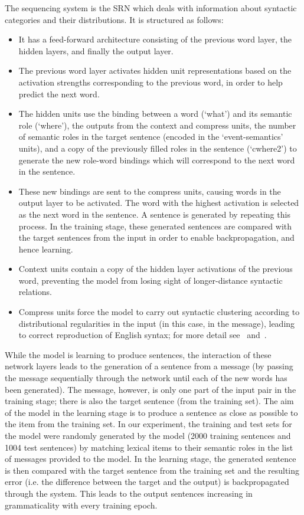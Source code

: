 \documentclass{article}
\begin{document}
The sequencing system is the SRN which deals with information about syntactic categories and their distributions. It is structured as follows:
\begin{itemize}
	\item It has a feed-forward architecture consisting of the previous word layer, the hidden layers, and finally the output layer.
	\item The previous word layer activates hidden unit representations based on the activation strengths corresponding to the previous word, in order to help predict the next word.
	\item The hidden units use the binding between a word (`what') and its semantic role (`where'), the outputs from the context and compress units, the number of semantic roles in the target sentence (encoded in the `event-semantics' units), and a copy of the previously filled roles in the sentence (`cwhere2') to generate the new role-word bindings which will correspond to the next word in the sentence.
	\item These new bindings are sent to the compress units, causing words in the output layer to be activated. The word with the highest activation is selected as the next word in the sentence. A sentence is generated by repeating this process. In the training stage, these generated sentences are compared with the target sentences from the input in order to enable backpropagation, and hence learning.
	\item Context units contain a copy of the hidden layer activations of the previous word, preventing the model from losing sight of longer-distance syntactic relations.
    \item Compress units force the model to carry out syntactic clustering according to distributional regularities in the input (in this case, in the message), leading to correct reproduction of English syntax; for more detail see~\cite{twomey2014} and~\cite{elman1993}.
\end{itemize}

While the model is learning to produce sentences, the interaction of these network layers leads to the generation of a sentence from a message (by passing the message sequentially through the network until each of the new words has been generated). The message, however, is only one part of the input pair in the training stage; there is also the target sentence (from the training set). The aim of the model in the learning stage is to produce a sentence as close as possible to the item from the training set. In our experiment, the training and test sets for the model were randomly generated by the model (2000 training sentences and 1004 test sentences) by matching lexical items to their semantic roles in the list of messages provided to the model. In the learning stage, the generated sentence is then compared with the target sentence from the training set and the resulting error (i.e. the difference between the target and the output) is backpropagated through the system. This leads to the output sentences increasing in grammaticality with every training epoch. 
\end{document}
